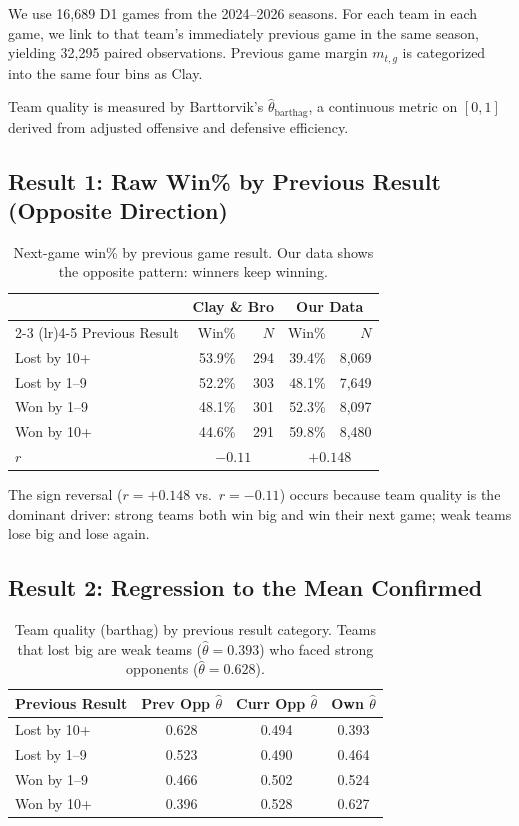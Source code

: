 \documentclass[11pt]{article}
\begin{document}
We use 16,689 D1 games from the 2024--2026 seasons. For each team in each game, we link to that team's immediately previous game in the same season, yielding 32,295 paired observations. Previous game margin $m_{t,g}$ is categorized into the same four bins as Clay.

Team quality is measured by Barttorvik's $\hat{\theta}_{\text{barthag}}$, a continuous metric on $[0, 1]$ derived from adjusted offensive and defensive efficiency.

\subsection{Result 1: Raw Win\% by Previous Result (Opposite Direction)}

\begin{table}[h]
\centering
\begin{tabular}{lrrrr}
\toprule
& \multicolumn{2}{c}{Clay \& Bro} & \multicolumn{2}{c}{Our Data} \\
\cmidrule(lr){2-3} \cmidrule(lr){4-5}
Previous Result & Win\% & $N$ & Win\% & $N$ \\
\midrule
Lost by 10+ & 53.9\% & 294 & 39.4\% & 8{,}069 \\
Lost by 1--9 & 52.2\% & 303 & 48.1\% & 7{,}649 \\
Won by 1--9 & 48.1\% & 301 & 52.3\% & 8{,}097 \\
Won by 10+ & 44.6\% & 291 & 59.8\% & 8{,}480 \\
\midrule
$r$ & \multicolumn{2}{c}{$-0.11$} & \multicolumn{2}{c}{$+0.148$} \\
\bottomrule
\end{tabular}
\caption{Next-game win\% by previous game result. Our data shows the opposite pattern: winners keep winning.}
\label{tab:raw_comparison}
\end{table}

\noindent The sign reversal ($r = +0.148$ vs.\ $r = -0.11$) occurs because team quality is the dominant driver: strong teams both win big and win their next game; weak teams lose big and lose again.

\subsection{Result 2: Regression to the Mean Confirmed}

\begin{table}[h]
\centering
\begin{tabular}{lccc}
\toprule
Previous Result & Prev Opp $\hat{\theta}$ & Curr Opp $\hat{\theta}$ & Own $\hat{\theta}$ \\
\midrule
Lost by 10+ & 0.628 & 0.494 & 0.393 \\
Lost by 1--9 & 0.523 & 0.490 & 0.464 \\
Won by 1--9 & 0.466 & 0.502 & 0.524 \\
Won by 10+ & 0.396 & 0.528 & 0.627 \\
\bottomrule
\end{tabular}
\caption{Team quality (barthag) by previous result category. Teams that lost big are weak teams ($\hat{\theta} = 0.393$) who faced strong opponents ($\hat{\theta} = 0.628$).}
\label{tab:quality_confound}
\end{table}
\end{document}
